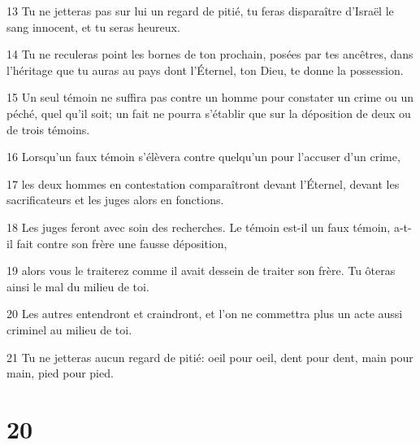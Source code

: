 \par 13 Tu ne jetteras pas sur lui un regard de pitié, tu feras disparaître d'Israël le sang innocent, et tu seras heureux.
\par 14 Tu ne reculeras point les bornes de ton prochain, posées par tes ancêtres, dans l'héritage que tu auras au pays dont l'Éternel, ton Dieu, te donne la possession.
\par 15 Un seul témoin ne suffira pas contre un homme pour constater un crime ou un péché, quel qu'il soit; un fait ne pourra s'établir que sur la déposition de deux ou de trois témoins.
\par 16 Lorsqu'un faux témoin s'élèvera contre quelqu'un pour l'accuser d'un crime,
\par 17 les deux hommes en contestation comparaîtront devant l'Éternel, devant les sacrificateurs et les juges alors en fonctions.
\par 18 Les juges feront avec soin des recherches. Le témoin est-il un faux témoin, a-t-il fait contre son frère une fausse déposition,
\par 19 alors vous le traiterez comme il avait dessein de traiter son frère. Tu ôteras ainsi le mal du milieu de toi.
\par 20 Les autres entendront et craindront, et l'on ne commettra plus un acte aussi criminel au milieu de toi.
\par 21 Tu ne jetteras aucun regard de pitié: oeil pour oeil, dent pour dent, main pour main, pied pour pied.

\chapter{20}

